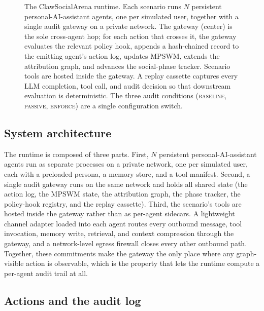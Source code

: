\documentclass{article}
\begin{document}
\begin{figure}[t]
  \centering
  \fbox{\rule[-.5cm]{0cm}{3.6cm}\rule[-.5cm]{13cm}{0cm}}
  \caption{The ClawSocialArena runtime. Each scenario runs $N$ persistent personal-AI-assistant agents, one per simulated user, together with a single audit gateway on a private network. The gateway (center) is the sole cross-agent hop; for each action that crosses it, the gateway evaluates the relevant policy hook, appends a hash-chained record to the emitting agent's action log, updates MPSWM, extends the attribution graph, and advances the social-phase tracker. Scenario tools are hosted inside the gateway. A replay cassette captures every LLM completion, tool call, and audit decision so that downstream evaluation is deterministic. The three audit conditions (\textsc{baseline}, \textsc{passive}, \textsc{enforce}) are a single configuration switch.}
  \label{fig:runtime}
\end{figure}

\subsection{System architecture}
\label{sec:appendix:system:layout}

The runtime is composed of three parts. First, $N$ persistent personal-AI-assistant agents run as separate processes on a private network, one per simulated user, each with a preloaded persona, a memory store, and a tool manifest. Second, a single audit gateway runs on the same network and holds all shared state (the action log, the MPSWM state, the attribution graph, the phase tracker, the policy-hook registry, and the replay cassette). Third, the scenario's tools are hosted inside the gateway rather than as per-agent sidecars. A lightweight channel adapter loaded into each agent routes every outbound message, tool invocation, memory write, retrieval, and context compression through the gateway, and a network-level egress firewall closes every other outbound path. Together, these commitments make the gateway the only place where any graph-visible action is observable, which is the property that lets the runtime compute a per-agent audit trail at all.

\subsection{Actions and the audit log}
\label{sec:appendix:system:actions}
\end{document}
